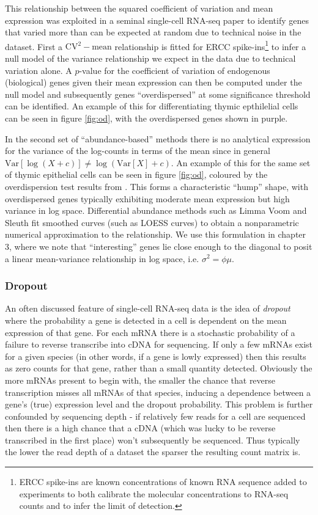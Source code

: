 This relationship between the squared coefficient of variation and mean expression was exploited in a seminal single-cell RNA-seq paper \cite{Brennecke2013-xy} to identify genes that varied more than can be expected at random due to technical noise in the dataset. First a $\text{CV}^2-\text{mean}$ relationship is fitted for ERCC spike-ins\footnote{
ERCC spike-ins are known concentrations of known RNA sequence added to experiments to both calibrate the molecular concentrations to RNA-seq counts and to infer the limit of detection.
} to infer a null model of the variance relationship we expect in the data due to technical variation alone. A $p$-value for the coefficient of variation of endogenous (biological) genes given their mean expression can then be computed under the null model and subsequently genes ``overdispersed'' at some significance threshold can be identified. An example of this for differentiating thymic epthilelial cells can be seen in figure \ref{fig:od}, with the overdispersed genes shown in purple.

In the second set of ``abundance-based'' methods there is no analytical expression for the variance of the log-counts in terms of the mean since in general $\text{Var}[\log(X + c)] \neq \log(\text{Var}[X] + c)$. An example of this for the same set of thymic epithelial cells can be seen in figure \ref{fig:od}, coloured by the overdispersion test results from \cite{Brennecke2013-xy}. This forms a characteristic ``hump'' shape, with overdispersed genes typically exhibiting moderate mean expression but high variance in log space. Differential abundance methods such as Limma Voom \cite{Law2014-tu} and Sleuth \cite{Pimentel2016-xz} fit smoothed curves (such as LOESS curves) to obtain a nonparametric numerical approximation to the relationship. We use this formulation in chapter 3, where we note that ``interesting'' genes lie close enough to the diagonal to posit a linear mean-variance relationship in log space, i.e. $\sigma^2 = \phi \mu$.

\subsubsection{Dropout} \label{sec:intro_dropout}

An often discussed feature of single-cell RNA-seq data is the idea of \emph{dropout} where the probability a gene is detected in a cell is dependent on the mean expression of that gene. For each mRNA there is a stochastic probability of a failure to reverse transcribe into cDNA for sequencing. If only a few mRNAs exist for a given species (in other words, if a gene is lowly expressed) then this results as zero counts for that gene, rather than a small quantity detected. Obviously the more mRNAs present to begin with, the smaller the chance that reverse transcription misses all mRNAs of that species, inducing a dependence between a gene's (true) expression level and the dropout probability. This problem is further confounded by sequencing depth - if relatively few reads for a cell are sequenced then there is a high chance that a cDNA (which was lucky to be reverse transcribed in the first place) won't subsequently be sequenced. Thus typically the lower the read depth of a dataset the sparser the resulting count matrix is.

